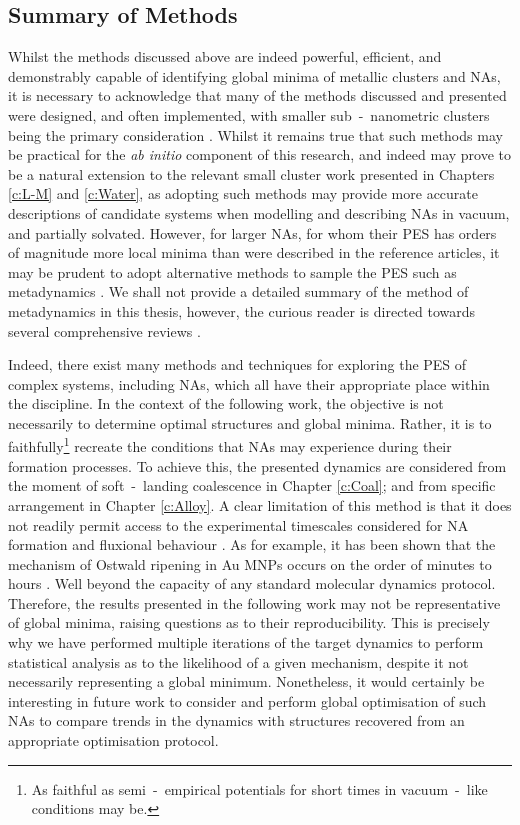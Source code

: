 \subsection{Summary of Methods}

Whilst the methods discussed above are indeed powerful, efficient, and demonstrably capable of identifying global minima of metallic clusters and NAs, it is necessary to acknowledge that many of the methods discussed and presented were designed, and often implemented, with smaller sub~-~nanometric clusters being the primary consideration \cite{C5CP01198A,doi:10.1021/acs.jctc.5b00962,doi:10.1080/00268970210162691,C7CP03346J}. Whilst it remains true that such methods may be practical for the \textit{ab initio} component of this research, and indeed may prove to be a natural extension to the relevant small cluster work presented in Chapters \ref{c:L-M} and \ref{c:Water}, as adopting such methods may provide more accurate descriptions of candidate systems when modelling and describing NAs in vacuum, and partially solvated. However, for larger NAs, for whom their PES has orders of magnitude more local minima than were described in the reference articles, it may be prudent to adopt alternative methods to sample the PES such as metadynamics \cite{10.1063/1.4935272}. We shall not provide a detailed summary of the method of metadynamics in this thesis, however, the curious reader is directed towards several comprehensive reviews \cite{https://doi.org/10.1002/wcms.31,doi:10.1146/annurev-physchem-040215-112229,Laio_2008}. 

Indeed, there exist many methods and techniques for exploring the PES of complex systems, including NAs, which all have their appropriate place within the discipline. In the context of the following work, the objective is not necessarily to determine optimal structures and global minima. Rather, it is to faithfully\footnote[3]{As faithful as semi~-~empirical potentials for short times in vacuum~-~like conditions may be.} recreate the conditions that NAs may experience during their formation processes. To achieve this, the presented dynamics are considered from the moment of soft~-~landing coalescence in Chapter \ref{c:Coal}; and from specific arrangement in Chapter \ref{c:Alloy}. A clear limitation of this method is that it does not readily permit access to the experimental timescales considered for NA formation and fluxional behaviour \cite{https://doi.org/10.1002/smll.201001138,https://doi.org/10.1002/smll.200801169}. As for example, it has been shown that the mechanism of Ostwald ripening in Au MNPs occurs on the order of minutes to hours \cite{doi:10.1021/acs.langmuir.6b02662}. Well beyond the capacity of any standard molecular dynamics protocol. Therefore, the results presented in the following work may not be representative of global minima, raising questions as to their reproducibility. This is precisely why we have performed multiple iterations of the target dynamics to perform statistical analysis as to the likelihood of a given mechanism, despite it not necessarily representing a global minimum. Nonetheless, it would certainly be interesting in future work to consider and perform global optimisation of such NAs to compare trends in the dynamics with structures recovered from an appropriate optimisation protocol. 